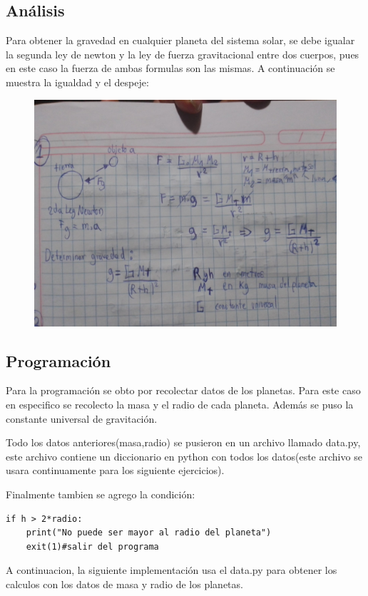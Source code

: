 \documentclass[a4paper,12pt]{article}
\begin{document}
    \subsection{Análisis}
        Para obtener la gravedad en cualquier planeta del sistema 
        solar, se debe igualar la segunda ley de newton y la ley 
        de fuerza gravitacional entre dos cuerpos, pues en este
        caso la fuerza de ambas formulas son las mismas.
        A continuación se muestra la igualdad y el despeje:
        \begin{figure}[!htbp]
            \centering
            \includegraphics[scale=0.3]{ejer1fc}
        \end{figure}
    \newpage
    \subsection{Programación}
        Para la programación se obto por recolectar datos de los planetas.
        Para este caso en especifico se recolecto la masa y el radio de 
        cada planeta. Además se puso la constante universal de gravitación.
        
        Todo los datos anteriores(masa,radio) se pusieron en un 
        archivo llamado data.py, este archivo contiene un diccionario 
        en python con todos los datos(este archivo se usara continuamente
        para los siguiente ejercicios).
        

        Finalmente tambien se agrego la condición:
        \begin{lstlisting}
if h > 2*radio:
    print("No puede ser mayor al radio del planeta")
    exit(1)#salir del programa    
        \end{lstlisting}
        A continuacion, la siguiente implementación usa el data.py para obtener los calculos con los datos de masa y radio de los planetas.
        
\end{document}
